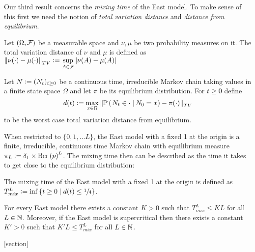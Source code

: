 Our third result concerns the \textit{mixing time} of the East model. To make sense of this first we need the notion of \textit{total variation distance} and \textit{distance from equilibrium}. 
\begin{definition}
Let $(\Omega, \cal{F})$ be a measurable space and $\nu, \mu$ be two probability measures on it. The total variation distance of $\nu$ and $\mu$ is defined as $\left\Vert \nu(\cdot) - \mu(\cdot) \right\Vert_{TV} \defeq \sup\limits_{A \in \cal{F}} \left| \nu(A) - \mu(A) \right|$
\end{definition}
\begin{definition}\label{def:eq_distance}
Let $N \defeq (N_t)_{t \geq 0}$ be a continuous time, irreducible Markov chain taking values in a finite state space $\Omega$ and let $\pi$ be its equilibrium distribution. For $t \geq 0$ define 
\begin{equation}\nonumber
d(t) \defeq \max\limits_{x \in \Omega} \left\Vert \PrCond{N_t \in \cdot\ }{N_0 = x} - \pi(\cdot) \right\Vert_{TV} 
\end{equation}
to be the worst case total variation distance from equilibrium. 
\end{definition}

When restricted to $\{0, 1, ... L\}$, the East model with a fixed 1 at the origin is a finite, irreducible, continuous time Markov chain with equilibrium measure $\pi_L \defeq \delta_{1} \times \dBer{p}^L$. The mixing time then can be described as the time it takes to get close to the equilibrium distribution:
\begin{definition}
The mixing time of the East model with a fixed 1 at the origin is defined as $T^L_{mix} \defeq \inf\left\{ t \geq 0 \mid d(t) \leq \sfrac{1}{4} \right\}$. 
\end{definition}

\begin{theorem}\label{main_thm:mixing}
For every East model there exists a constant $K > 0$ such that $T^L_{mix} \leq KL$ for all $L \in \N$. Moreover, if the East model is supercritical then there exists a constant $K' > 0$ such that $K'L \leq T^L_{mix}$ for all $L \in \N$. 
\end{theorem}

[section]
